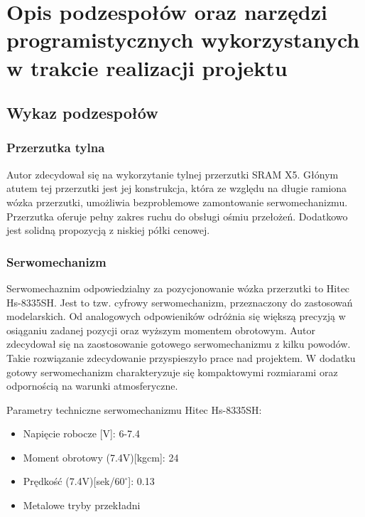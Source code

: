 \chapter{Opis podzespołów oraz narzędzi programistycznych wykorzystanych w trakcie realizacji projektu}
\section{Wykaz podzespołów}
\subsection{Przerzutka tylna}
Autor zdecydował się na wykorzytanie tylnej przerzutki SRAM X5. Głónym atutem tej przerzutki jest jej konstrukcja, która ze względu na długie ramiona wózka przerzutki, umożliwia bezproblemowe zamontowanie serwomechanizmu. Przerzutka oferuje pełny zakres ruchu do obsługi ośmiu przełożeń. Dodatkowo jest solidną propozycją z niskiej półki cenowej.
\subsection{Serwomechanizm}
Serwomechaznim odpowiedzialny za pozycjonowanie wózka przerzutki to Hitec Hs-8335SH. Jest to tzw. cyfrowy serwomechanizm, przeznaczony do zastosowań modelarskich. Od analogowych odpowieników odróżnia się większą precyzją w osiąganiu zadanej pozycji oraz wyższym momentem obrotowym. Autor zdecydował się na zaostosowanie gotowego serwomechanizmu z kilku powodów. Takie rozwiązanie zdecydowanie przyspieszyło prace nad projektem. W dodatku gotowy serwomechanizm charakteryzuje się kompaktowymi rozmiarami oraz odpornością na warunki atmosferyczne.  

Parametry techniczne serwomechanizmu Hitec Hs-8335SH:
\begin{itemize}
\item
Napięcie robocze [V]: 6-7.4
\item
Moment obrotowy (7.4V)[kgcm]: 24
\item
Prędkość (7.4V)[sek/$60^{\circ}$]: 0.13
\item
Metalowe tryby przekładni
\end{itemize} 
